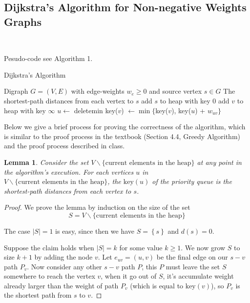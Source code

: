 \documentclass[11pt]{article}
\theoremstyle{plain}
\newtheorem{lemma}{Lemma}[section]
\begin{document}
\subsection{Dijkstra's Algorithm for Non-negative Weights Graphs}\

Pesudo-code see Algorithm 1.

\begin{algorithm}
  \caption{Dijkstra's Algorithm}
  \begin{algorithmic}[1]
  \REQUIRE Digraph $G = (V, E)$ with edge-weights $w_e \geq 0$ and source vertex $s \in G$
  \ENSURE The shortest-path distances from each vertex to $s$
  \STATE add $s$ to heap with key $0$
      \STATE add $v$ to heap with key $\infty$
  \ENDFOR
      \STATE $u \leftarrow$ deletemin
          \STATE key($v$) $\leftarrow \min\{$key($v$), key($u$) + $w_{uv}\}$ 
      \ENDFOR
  \ENDWHILE
  \end{algorithmic}
  \end{algorithm}

  Below we give a brief process for proving the correctness of the algorithm, which is similar to 
  the proof process in the textbook (Section 4.4, Greedy Algorithm) and the proof process described in class.

  \begin{lemma}
    Consider the set $V \backslash \{\text{current elements in the heap}\}$ at any point in the 
    algorithm's execution. For each vertices $u$ in $V \backslash \{\text{current elements in the heap}\}$, 
    the $\text{key}(u)$ of the priority queue is the shortest-path distances from each vertex to $s$.
  \end{lemma}

  \begin{proof}
    We prove the lemma by induction on the size of the set 
    \[
      S = V \backslash \{\text{current elements in the heap}\}
    \]

    The case $|S|=1$ is easy, since then we have $S = \left\{ s \right\} $ and $d(s) = 0$.

    Suppose the claim holds when $|S| = k$ for some value $k \geq 1$. We now grow $S$ to size $k+1$ by adding the node $v$.
    Let $e_{uv}=(u, v)$ be the final edge on our $s-v$ path $P_v$. Now consider any other $s-v$ path $P$, 
    this $P$ must leave the set $S$ somewhere to reach the vertex $v$, when it go out of $S$, it's accumulate 
    weight already larger than the weight of path $P_v$ (which is equal to $\text{key}(v)$), so $P_v$ is the shortest path from $s$ to $v$.
  \end{proof}
\end{document}
